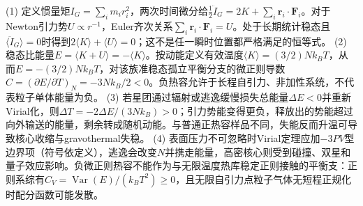 (1) 定义惯量矩\(I_G=\sum_im_ir_i^2\)，两次时间微分给\(\frac12\ddot I_G=2K+\sum_i\boldsymbol r_i\cdot\boldsymbol F_i\)。对于Newton引力势\(U\propto r^{-1}\)，Euler齐次关系\(\sum_i\boldsymbol r_i\cdot\boldsymbol F_i=U\)。处于长期统计稳态且\(\langle\ddot I_G\rangle=0\)时得到\(2\langle K\rangle+\langle U\rangle=0\)；这不是任一瞬时位置都严格满足的恒等式。
(2) 稳态比能量\(E=\langle K+U\rangle=-\langle K\rangle\)。按动能定义有效温度\(\langle K\rangle=(3/2)Nk_BT\)，从而\(E=-(3/2)Nk_BT\)，对该族准稳态孤立平衡分支的微正则导数\(C=(\partial E/\partial T)_N=-3Nk_B/2<0\)。负热容允许于长程自引力、非加性系统，不代表粒子单体能量为负。
(3) 若星团通过辐射或逃逸缓慢损失总能量\(\Delta E<0\)并重新Virial化，则\(\Delta T=-2\Delta E/(3Nk_B)>0\)；引力势能变得更负，释放出的势能超过向外输送的能量，剩余转成随机动能。与普通正热容样品不同，失能反而升温可导致核心收缩与gravothermal失稳。
(4) 表面压力不可忽略时Virial定理应加\(-3PV\)型边界项（符号依定义），逃逸会改变\(N\)并携走能量，高密核心则受到碰撞、双星和量子效应影响。负微正则热容不能作为与无限温度热库稳定正则接触的平衡支：正则系综有\(C_V=\operatorname{Var}(E)/(k_BT^2)\ge0\)，且无限自引力点粒子气体无短程正规化时配分函数可能发散。
